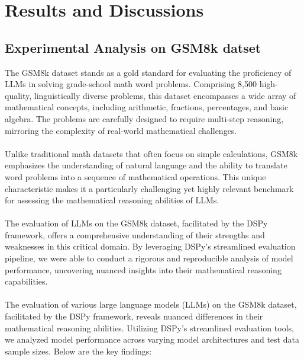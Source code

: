 \chapter{Results and Discussions}

\section{Experimental Analysis on GSM8k datset}

The GSM8k dataset stands as a gold standard for evaluating the proficiency of LLMs in solving grade-school math word problems. Comprising 8,500 high-quality, linguistically diverse problems, this dataset encompasses a wide array of mathematical concepts, including arithmetic, fractions, percentages, and basic algebra. The problems are carefully designed to require multi-step reasoning, mirroring the complexity of real-world mathematical challenges.\\
\\
Unlike traditional math datasets that often focus on simple calculations, GSM8k emphasizes the understanding of natural language and the ability to translate word problems into a sequence of mathematical operations. This unique characteristic makes it a particularly challenging yet highly relevant benchmark for assessing the mathematical reasoning abilities of LLMs.\\
\\
The evaluation of LLMs on the GSM8k dataset, facilitated by the DSPy framework, offers a comprehensive understanding of their strengths and weaknesses in this critical domain. By leveraging DSPy's streamlined evaluation pipeline, we were able to conduct a rigorous and reproducible analysis of model performance, uncovering nuanced insights into their mathematical reasoning capabilities.\\
\\
The evaluation of various large language models (LLMs) on the GSM8k dataset, facilitated by the DSPy framework, reveals nuanced differences in their mathematical reasoning abilities. Utilizing DSPy's streamlined evaluation tools, we analyzed model performance across varying model architectures and test data sample sizes. Below are the key findings:


